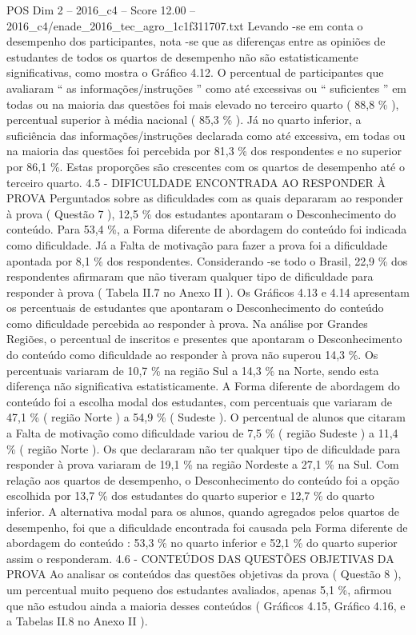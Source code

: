 \begin{textsample}{POS Dim 2 – 2016\_c4 – Score 12.00 – 2016\_c4/enade\_2016\_tec\_agro\_1c1f311707.txt}
Levando -se em conta o desempenho dos participantes, nota -se que as diferenças entre as opiniões de estudantes de todos os quartos de desempenho não são estatisticamente significativas, como mostra o Gráfico 4.12.
O percentual de participantes que avaliaram “ as informações/instruções ” como até excessivas ou “ suficientes ” em todas ou na maioria das questões foi mais elevado no terceiro quarto ( 88,8 \% ), percentual superior à média nacional ( 85,3 \% ).
Já no quarto inferior, a suficiência das informações/instruções declarada como até excessiva, em todas ou na maioria das questões foi percebida por 81,3 \% dos respondentes e no superior por 86,1 \%.
Estas proporções são crescentes com os quartos de desempenho até o terceiro quarto. 4.5 - DIFICULDADE ENCONTRADA AO RESPONDER À PROVA Perguntados sobre as dificuldades com as quais depararam ao responder à prova ( Questão 7 ), 12,5 \% dos estudantes apontaram o Desconhecimento do conteúdo.
Para 53,4 \%, a Forma diferente de abordagem do conteúdo foi indicada como dificuldade.
Já a Falta de motivação para fazer a prova foi a dificuldade apontada por 8,1 \% dos respondentes.
Considerando -se todo o Brasil, 22,9 \% dos respondentes afirmaram que não tiveram qualquer tipo de dificuldade para responder à prova ( Tabela II.7 no Anexo II ).
Os Gráficos 4.13 e 4.14 apresentam os percentuais de estudantes que apontaram o Desconhecimento do conteúdo como dificuldade percebida ao responder à prova.
Na análise por Grandes Regiões, o percentual de inscritos e presentes que apontaram o Desconhecimento do conteúdo como dificuldade ao responder à prova não superou 14,3 \%.
Os percentuais variaram de 10,7 \% na região Sul a 14,3 \% na Norte, sendo esta diferença não significativa estatisticamente.
A Forma diferente de abordagem do conteúdo foi a escolha modal dos estudantes, com percentuais que variaram de 47,1 \% ( região Norte ) a 54,9 \% ( Sudeste ).
O percentual de alunos que citaram a Falta de motivação como dificuldade variou de 7,5 \% ( região Sudeste ) a 11,4 \% ( região Norte ).
Os que declararam não ter qualquer tipo de dificuldade para responder à prova variaram de 19,1 \% na região Nordeste a 27,1 \% na Sul.
Com relação aos quartos de desempenho, o Desconhecimento do conteúdo foi a opção escolhida por 13,7 \% dos estudantes do quarto superior e 12,7 \% do quarto inferior.
A alternativa modal para os alunos, quando agregados pelos quartos de desempenho, foi que a dificuldade encontrada foi causada pela Forma diferente de abordagem do conteúdo : 53,3 \% no quarto inferior e 52,1 \% do quarto superior assim o responderam. 4.6 - CONTEÚDOS DAS QUESTÕES OBJETIVAS DA PROVA Ao analisar os conteúdos das questões objetivas da prova ( Questão 8 ), um percentual muito pequeno dos estudantes avaliados, apenas 5,1 \%, afirmou que não estudou ainda a maioria desses conteúdos ( Gráficos 4.15, Gráfico 4.16, e a Tabelas II.8 no Anexo II ).

\end{textsample}
